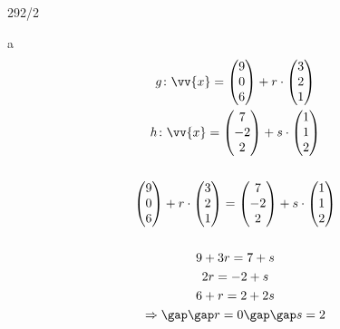 \newpage
\begin{exercise}{292/2}
  \item [a]
  \begin{gather*}
    g \colon \vv{x} = \begin{pmatrix}9 \\ 0 \\ 6\end{pmatrix} + r \cdot \begin{pmatrix}3 \\ 2 \\ 1\end{pmatrix} \\
    h \colon \vv{x} = \begin{pmatrix}7 \\ -2 \\ 2\end{pmatrix} + s \cdot \begin{pmatrix}1 \\ 1 \\ 2\end{pmatrix} \\\\
    \begin{pmatrix}9 \\ 0 \\ 6\end{pmatrix} + r \cdot \begin{pmatrix}3 \\ 2 \\ 1\end{pmatrix} = \begin{pmatrix}7 \\ -2 \\ 2\end{pmatrix} + s \cdot \begin{pmatrix}1 \\ 1 \\ 2\end{pmatrix} \\\\
    9 + 3r = 7 + s \\
    2r = -2 + s \\
    6 + r = 2 + 2s \\
    \Rightarrow \gap\gap r = 0 \gap\gap s = 2 \\\\

\end{gather*}
\end{exercise}
